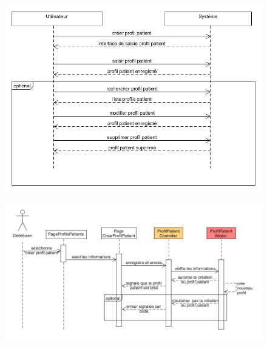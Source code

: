 \documentclass{beamer}
\begin{document}
\begin{frame}[plain]{}
\begin{figure}
\centering
\includegraphics[scale=0.4]{../CasDUtilisations/ProfilPatient/diagseqProfilPatient.png}
\end{figure}
\end{frame}

\begin{frame}[plain]{}
\begin{figure}
\centering
\includegraphics[scale=0.4]{../CasDUtilisations/ProfilPatient/diagSrqDetaillProfilPatient.png}
\end{figure}
\end{frame}
\end{document}
